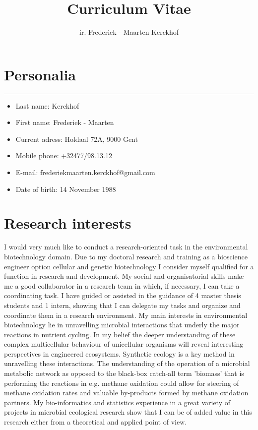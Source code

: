 \documentclass[a4paper,11pt,oneside]{article}
\title{Curriculum Vitae}
\author{ir. Frederiek - Maarten Kerckhof}
\begin{document}
\maketitle

\section*{Personalia}
\rule{\textwidth}{1pt}
\begin{itemize}
  \item Last name: Kerckhof
  \item First name: Frederiek - Maarten
  \item Current adress: Holdaal 72A, 9000 Gent
  \item Mobile phone: +32477/98.13.12
  \item E-mail: frederiekmaarten.kerckhof@gmail.com
  \item Date of birth: 14 November 1988
\end{itemize}
\section*{Research interests}
I would very much like to conduct a research-oriented task in the environmental biotechnology domain. Due to my doctoral research and training as a bioscience engineer option cellular and genetic biotechnology I consider myself qualified for a function in research and development. My social and organisatorial skills make me a good collaborator in a research team in which, if necessary, I can take a coordinating task. I have guided or assisted in the guidance of 4 master thesis students and 1 intern, showing that I can delegate my tasks and organize and coordinate them in a research environment.  My main interests in environmental biotechnology lie in unravelling microbial interactions that underly the major reactions in nutrient cycling. In my belief the deeper understanding of these complex multicellular behaviour of unicellular organisms will reveal interesting perspectives in engineered ecosystems. Synthetic ecology is a key method in unravelling these interactions. The understanding of the operation of a microbial metabolic network  as opposed to the black-box catch-all term 'biomass' that is performing the reactions in e.g. methane oxidation could allow for steering of methane oxidation rates and valuable by-products formed by methane oxidation partners. My bio-informatics and statistics experience in a great variety of projects in microbial ecological research show that I can be of added value in this research either from a theoretical and applied point of view.
\end{document}

